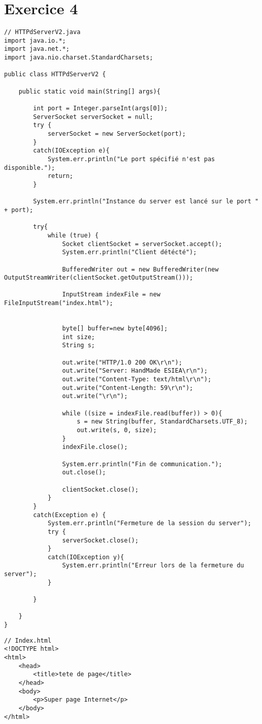\documentclass{article}
\begin{document}
\section*{Exercice 4}
\begin{lstlisting}
// HTTPdServerV2.java
import java.io.*;
import java.net.*;
import java.nio.charset.StandardCharsets;

public class HTTPdServerV2 {

    public static void main(String[] args){

        int port = Integer.parseInt(args[0]);
        ServerSocket serverSocket = null;
        try {
            serverSocket = new ServerSocket(port);
        }
        catch(IOException e){
            System.err.println("Le port spécifié n'est pas disponible.");
            return;
        }
        
        System.err.println("Instance du server est lancé sur le port " + port);
    
        try{
            while (true) {
                Socket clientSocket = serverSocket.accept();
                System.err.println("Client détécté");
        
                BufferedWriter out = new BufferedWriter(new OutputStreamWriter(clientSocket.getOutputStream()));
        
                InputStream indexFile = new FileInputStream("index.html");
        

                byte[] buffer=new byte[4096];
                int size;
                String s;

                out.write("HTTP/1.0 200 OK\r\n");
                out.write("Server: HandMade ESIEA\r\n");
                out.write("Content-Type: text/html\r\n");
                out.write("Content-Length: 59\r\n");
                out.write("\r\n");

                while ((size = indexFile.read(buffer)) > 0){
                    s = new String(buffer, StandardCharsets.UTF_8);
                    out.write(s, 0, size);
                }
                indexFile.close();
                
                System.err.println("Fin de communication.");
                out.close();
                
                clientSocket.close();
            }
        }
        catch(Exception e) {
            System.err.println("Fermeture de la session du server");
            try {
                serverSocket.close();
            }
            catch(IOException y){
                System.err.println("Erreur lors de la fermeture du server");
            }
            
        }
        
    }
}
\end{lstlisting}
\begin{lstlisting}
// Index.html
<!DOCTYPE html>
<html>
    <head>
        <title>tete de page</title>
    </head>
    <body>
        <p>Super page Internet</p>
    </body>
</html>
\end{lstlisting}
\end{document}
